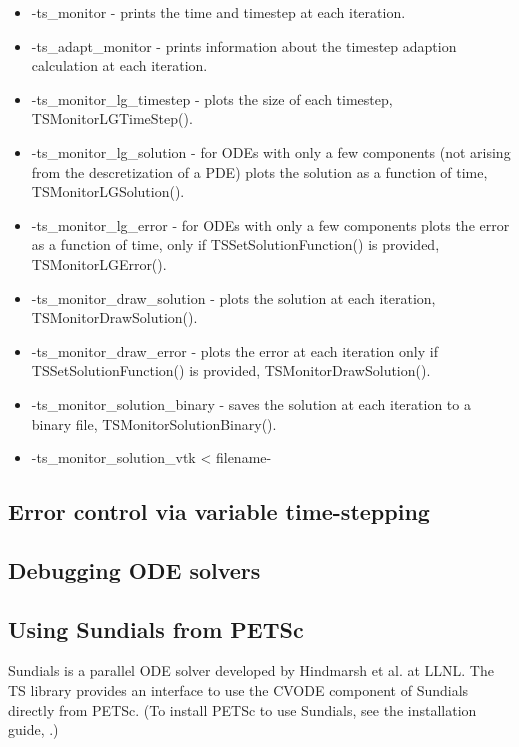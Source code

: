\begin{itemize}
\item  -ts\_monitor - prints the time and timestep at each iteration.
\item  -ts\_adapt\_monitor - prints information about the timestep adaption calculation at each iteration.
\item  -ts\_monitor\_lg\_timestep - plots the size of each timestep, TSMonitorLGTimeStep().
\item  -ts\_monitor\_lg\_solution - for ODEs with only a few components (not arising from the descretization of a PDE) plots the solution as a function of time, TSMonitorLGSolution().
\item  -ts\_monitor\_lg\_error - for ODEs with only a few components plots the error as a function of time, only if TSSetSolutionFunction() is provided, TSMonitorLGError().
\item  -ts\_monitor\_draw\_solution - plots the solution at each iteration, TSMonitorDrawSolution().
\item  -ts\_monitor\_draw\_error - plots the error at each iteration only if TSSetSolutionFunction() is provided, TSMonitorDrawSolution().
\item  -ts\_monitor\_solution\_binary - saves the solution at each iteration to a binary file, TSMonitorSolutionBinary().
\item  -ts\_monitor\_solution\_vtk < filename-%
\end{itemize}

\subsection{Error control via variable time-stepping}

\subsection{Debugging ODE solvers}

\subsection{Using Sundials from PETSc}
\label{sec_sundials}

Sundials is a parallel ODE solver developed by Hindmarsh et al. at LLNL.
The TS library provides an interface to use the CVODE component of
Sundials directly from PETSc.  (To install PETSc to use Sundials, see
the installation guide, .)

